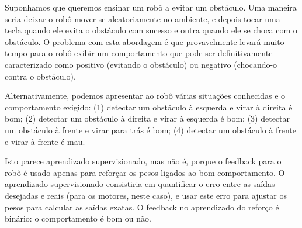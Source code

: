 Suponhamos que queremos ensinar um robô a evitar um obstáculo. Uma maneira seria deixar o robô mover-se aleatoriamente no ambiente, e depois tocar uma tecla quando ele evita o obstáculo com sucesso e outra quando ele se choca com o obstáculo. O problema com esta abordagem é que provavelmente levará muito tempo para o robô exibir um comportamento que pode ser definitivamente caracterizado como positivo (evitando o obstáculo) ou negativo (chocando-o contra o obstáculo).

Alternativamente, podemos apresentar ao robô várias situações conhecidas e o comportamento exigido: (1) detectar um obstáculo à esquerda e virar à direita é bom; (2) detectar um obstáculo à direita e virar à esquerda é bom; (3) detectar um obstáculo à frente e virar para trás é bom; (4) detectar um obstáculo à frente e virar à frente é mau.

Isto parece aprendizado supervisionado, mas não é, porque o feedback para o robô é usado apenas para reforçar os pesos ligados ao bom comportamento. O aprendizado supervisionado consistiria em quantificar o erro entre as saídas desejadas e reais (para os motores, neste caso), e usar este erro para ajustar os pesos para calcular as saídas exatas. O feedback no aprendizado do reforço é binário: o comportamento é bom ou não.

